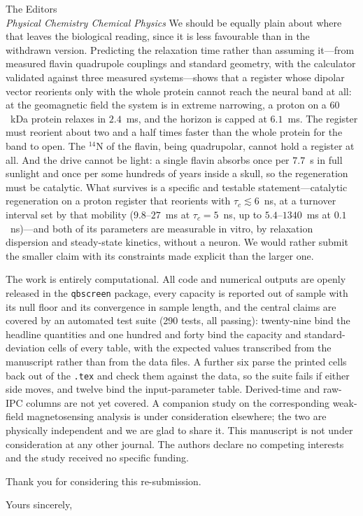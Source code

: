 \documentclass[11pt]{letter}
\begin{document}
\begin{letter}{The Editors\\ \textit{Physical Chemistry Chemical Physics}}
We should be equally plain about where that leaves the biological reading, since
it is less favourable than in the withdrawn version. Predicting the relaxation
time rather than assuming it---from measured flavin quadrupole couplings and
standard geometry, with the calculator validated against three measured
systems---shows that a register whose dipolar vector reorients only with the whole
protein cannot reach the neural band
at all: at the geomagnetic field the system is in extreme narrowing, a proton on a
$60$~kDa protein relaxes in $2.4$~ms, and the horizon is capped at $6.1$~ms. The
register must reorient about two and a half times faster than the whole protein for the
band to open. The $^{14}$N of the flavin, being quadrupolar, cannot hold a
register at all. And the drive cannot be light: a single flavin absorbs once per
$7.7$~s in full sunlight and once per some hundreds of years inside a skull, so
the regeneration must be catalytic. What survives is a specific and testable
statement---catalytic regeneration on a proton register that reorients with
$\tau_c\lesssim6$~ns, at a turnover interval set by that mobility ($9.8$--$27$~ms
at $\tau_c=5$~ns, up to $5.4$--$1340$~ms at $0.1$~ns)---and both of its parameters are
measurable in vitro, by relaxation dispersion and steady-state kinetics, without
a neuron. We would rather submit the smaller claim with its constraints made
explicit than the larger one.

The work is entirely computational. All code and numerical outputs are openly
released in the \texttt{qbscreen} package, every capacity is reported out of sample
with its null floor and its convergence in sample length, and the central claims are
covered by an automated test suite (290 tests, all passing): twenty-nine bind the
headline quantities and one hundred and forty bind the capacity and
standard-deviation cells of every table, with the expected values transcribed
from the manuscript rather than from the data files. A further six parse the
printed cells back out of the \texttt{.tex} and check them against the data, so
the suite fails if either side moves, and twelve bind the input-parameter table.
Derived-time and raw-IPC columns are not yet covered. A companion study on the
corresponding weak-field magnetosensing analysis is under consideration elsewhere;
the two are physically independent and we are glad to share it. This manuscript is
not under consideration at any other journal. The authors declare no competing
interests and the study received no specific funding.

Thank you for considering this re-submission.

\closing{Yours sincerely,}

\end{letter}
\end{document}
